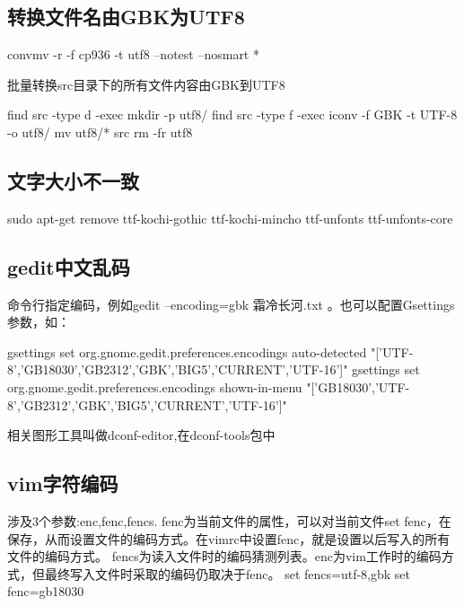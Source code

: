 \subsection{转换文件名由GBK为UTF8}
\begin{shellcmd}
convmv -r -f cp936 -t utf8 --notest --nosmart *
\end{shellcmd}

批量转换src目录下的所有文件内容由GBK到UTF8
\begin{shellcmd}
find src -type d -exec mkdir -p utf8/{} \;
find src -type f -exec iconv -f GBK -t UTF-8 {} -o utf8/{} \;
mv utf8/* src
rm -fr utf8
\end{shellcmd}

\subsection{文字大小不一致}
\begin{shellcmd}
sudo apt-get remove ttf-kochi-gothic ttf-kochi-mincho ttf-unfonts ttf-unfonts-core
\end{shellcmd}

\subsection{gedit中文乱码}

 命令行指定编码，例如gedit --encoding=gbk 霜冷长河.txt 。也可以配置Gsettings参数，如：
   
   \begin{shellcmd}
    gsettings set org.gnome.gedit.preferences.encodings auto-detected 
	"['UTF-8','GB18030','GB2312','GBK','BIG5','CURRENT','UTF-16']"
    gsettings set org.gnome.gedit.preferences.encodings shown-in-menu 
	"['GB18030','UTF-8','GB2312','GBK','BIG5','CURRENT','UTF-16']"
   \end{shellcmd}  

	相关图形工具叫做dconf-editor,在dconf-tools包中

  
  


\subsection{vim字符编码}
涉及3个参数:enc,fenc,fencs.
fenc为当前文件的属性，可以对当前文件set fenc，在保存，从而设置文件的编码方式。在vimrc中设置fenc，就是设置以后写入的所有文件的编码方式。
fencs为读入文件时的编码猜测列表。enc为vim工作时的编码方式，但最终写入文件时采取的编码仍取决于fenc。
 set fencs=utf-8,gbk
 set fenc=gb18030

